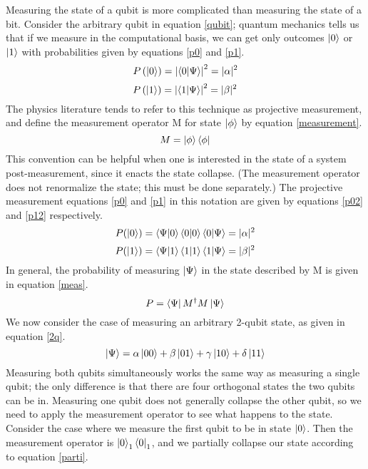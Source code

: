 \documentclass{article}
\begin{document}
\begin{paragraph}{}
Measuring the state of a qubit is more complicated than measuring the state of a bit.  Consider the arbitrary qubit in equation \ref{qubit}; quantum mechanics tells us that if we measure in the computational basis, we can get only outcomes $\ket{0}$ or $\ket{1}$ with probabilities given by equations \ref{p0} and \ref{p1}.
\begin{equation}\label{p0}
P\left(\ket{0}\right)=\left|\braket{0|\Psi}\right|^2=|\alpha|^2
\end{equation}
\begin{equation}\label{p1}
P\left(\ket{1}\right)=\left|\braket{1|\Psi}\right|^2=|\beta|^2
\end{equation}
The physics literature tends to refer to this technique as projective measurement, and define the measurement operator M for state $\ket{\phi}$ by equation \ref{measurement}. \cite{nielsen}
\begin{equation}\label{measurement}
M = \ket{\phi}\bra{\phi}
\end{equation}
This convention can be helpful when one is interested in the state of a system post-measurement, since it enacts the state collapse.  (The measurement operator does not renormalize the state; this must be done separately.)  The projective measurement equations \ref{p0} and \ref{p1} in this notation are given by equations \ref{p02} and \ref{p12} respectively. \cite{nielsen}
\begin{equation}\label{p02}
P(\ket{0})=\braket{\Psi|0}\braket{0|0}\braket{0|\Psi}=|\alpha|^2
\end{equation}
\begin{equation}\label{p12}
P(\ket{1})=\braket{\Psi|1}\braket{1|1}\braket{1|\Psi}=|\beta|^2
\end{equation}
In general, the probability of measuring $\ket{\Psi}$ in the state described by M is given in equation \ref{meas}. \cite{nielsen}
\begin{equation}\label{meas}
P = \bra{\Psi}M^\dagger M\ket{\Psi}
\end{equation}
We now consider the case of measuring an arbitrary 2-qubit state, as given in equation \ref{2q}.
\begin{equation}\label{2q}
\ket{\Psi}=\alpha\ket{00}+\beta\ket{01}+\gamma\ket{10}+\delta\ket{11}
\end{equation}
Measuring both qubits simultaneously works the same way as measuring a single qubit; the only difference is that there are four orthogonal states the two qubits can be in.  Measuring one qubit does not generally collapse the other qubit, so we need to apply the measurement operator to see what happens to the state.  Consider the case where we measure the first qubit to be in state $\ket{0}$.  Then the measurement operator is $\ket{0}_1\bra{0}_1$, and we partially collapse our state according to equation \ref{parti}.

\end{paragraph}
\end{document}
